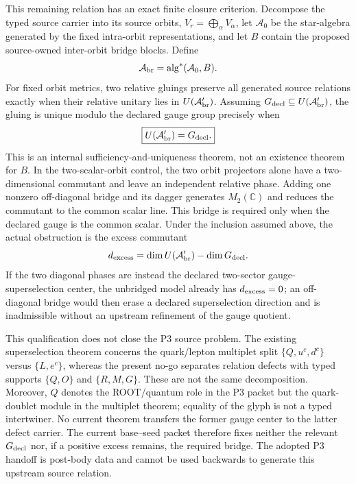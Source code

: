 This remaining relation has an exact finite closure criterion.  Decompose the
typed source carrier into its source orbits,
$V_r=\bigoplus_\alpha V_\alpha$, let $\mathcal A_0$ be the star-algebra
generated by the fixed intra-orbit representations, and let $B$ contain the
proposed source-owned inter-orbit bridge blocks.  Define
\begin{equation}
\mathcal A_{\rm br}=\operatorname{alg}^*(\mathcal A_0,B).
\label{eq:bridgealgebra}
\end{equation}
For fixed orbit metrics, two relative gluings preserve all generated source
relations exactly when their relative unitary lies in
$U(\mathcal A_{\rm br}')$.  Assuming
$G_{\rm decl}\subseteq U(\mathcal A_{\rm br}')$, the gluing is unique modulo
the declared gauge group precisely when
\begin{equation}
\boxed{U(\mathcal A_{\rm br}')=G_{\rm decl}.}
\label{eq:bridgecommutant}
\end{equation}
This is an internal sufficiency-and-uniqueness theorem, not an existence
theorem for $B$.  In the two-scalar-orbit control, the two orbit projectors
alone have a two-dimensional commutant and leave an independent relative
phase.  Adding one nonzero off-diagonal bridge and its dagger generates
$M_2(\mathbb C)$ and reduces the commutant to the common scalar line.  This
bridge is required only when the declared gauge is the common scalar.  Under
the inclusion assumed above, the actual obstruction is the excess commutant
\begin{equation}
d_{\rm excess}=\dim U(\mathcal A_{\rm br}')-\dim G_{\rm decl}.
\label{eq:bridgeexcess}
\end{equation}
If the two diagonal phases are instead the declared two-sector
gauge-superselection center, the unbridged model already has
$d_{\rm excess}=0$; an off-diagonal bridge would then erase a declared
superselection direction and is inadmissible without an upstream refinement
of the gauge quotient.

This qualification does not close the P3 source problem.  The existing
superselection theorem concerns the quark/lepton multiplet split
$\{Q,u^c,d^c\}$ versus $\{L,e^c\}$, whereas the present no-go separates
relation defects with typed supports $\{Q,O\}$ and $\{R,M,G\}$.  These are not
the same decomposition.  Moreover, $Q$ denotes the ROOT/quantum role in the
P3 packet but the quark-doublet module in the multiplet theorem; equality of
the glyph is not a typed intertwiner.  No current theorem transfers the former
gauge center to the latter defect carrier.  The current base--seed packet therefore
fixes neither the relevant $G_{\rm decl}$ nor, if a positive excess remains,
the required bridge.  The adopted P3 handoff is post-body data and cannot be
used backwards to generate this upstream source relation.

